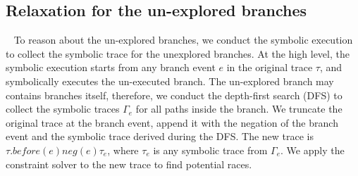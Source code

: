 



















 

 




 
\subsection{Relaxation for the un-explored branches}~\label{sec:unexplored}
To reason about the un-explored branches, we conduct the symbolic execution to collect the symbolic trace for the unexplored branches. 
At the high level, the symbolic execution starts from any branch event $e$ in the original trace $\tau$, and symbolically executes the un-executed branch. 
The un-explored branch may contains branches itself, therefore, we conduct the depth-first search (DFS) to collect the symbolic traces $\Gamma_e$ for all paths inside the branch.  We truncate the original trace at the branch event,  append it with the negation of the branch event and the symbolic trace derived during the DFS.  The new trace is $\tau.before(e) neg(e) \tau_e$, where $\tau_e$ is any symbolic trace from $\Gamma_e$. We apply the constraint solver to the new trace to find potential races.

